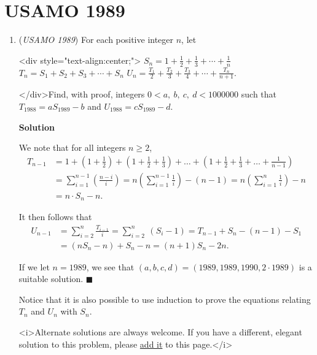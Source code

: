 \section{USAMO 1989}
        \begin{enumerate}
        	\item (\textit{USAMO 1989}) For each positive integer $n$, let


 <div style="text-align:center;">
$S_n = 1 + \frac 12 + \frac 13 + \cdots + \frac 1n$
$T_n = S_1 + S_2 + S_3 + \cdots + S_n$
$U_n = \frac{T_1}{2} + \frac{T_2}{3} + \frac{T_3}{4} + \cdots + \frac{T_n}{n+1}$.


 
</div>Find, with proof, integers $0 < a,\ b,\ c,\ d < 1000000$ such that $T_{1988} = a S_{1989} - b$ and $U_{1988} = c S_{1989} - d$.


 



\textbf{Solution}

We note that for all integers $n \ge 2$,
 \begin{align*} T_{n-1} &= 1 + \left(1 + \frac 12\right) + \left(1 + \frac 12 + \frac 13\right) + \ldots + \left(1 + \frac 12 + \frac 13 + \ldots + \frac 1{n-1}\right) \\  &= \sum_{i=1}^{n-1} \left(\frac {n-i}i\right) = n\left(\sum_{i=1}^{n-1} \frac{1}{i}\right) - (n-1) = n\left(\sum_{i=1}^{n} \frac{1}{i}\right) - n \\ &= n \cdot S_{n} - n .  \end{align*}


 It then follows that
 \begin{align*} U_{n-1} &= \sum_{i=2}^{n} \frac{T_{i-1}}{i} = \sum_{i=2}^{n}\ (S_{i} - 1) = T_{n-1} + S_n - (n-1) - S_1 \\ &= \left(nS_n - n\right) + S_n - n = (n + 1)S_n - 2n . \end{align*}


 If we let $n=1989$, we see that $(a,b,c,d) = (1989,1989,1990, 2\cdot 1989)$ is a suitable solution.  $\blacksquare$

 Notice that it is also possible to use induction to prove the equations relating $T_n$ and $U_n$ with $S_n$.

 
<i>Alternate solutions are always welcome. If you have a different, elegant solution to this problem, please \href{https://artofproblemsolving.com/wiki/index.php?title=1989\_USAMO\_Problems/Problem\_1&action=edit}{add it} to this page.</i>




\end{enumerate}
